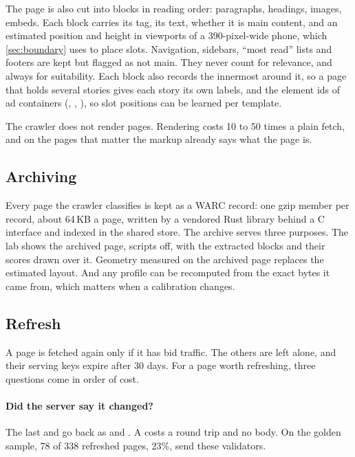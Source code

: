 The page is also cut into blocks in reading order: paragraphs, headings, images, embeds. Each block carries its tag, its text, whether it is main content, and an estimated position and height in viewports of a 390-pixel-wide phone, which \cref{sec:boundary} uses to place slots. Navigation, sidebars, ``most read'' lists and footers are kept but flagged as not main. They never count for relevance, and always for suitability. Each block also records the innermost  around it, so a page that holds several stories gives each story its own labels, and the element ids of ad containers (, , ), so slot positions can be learned per template.

The crawler does not render pages. Rendering costs 10 to 50 times a plain fetch, and on the pages that matter the markup already says what the page is.

\subsection{Archiving}\label{sec:crawl-archive}

Every page the crawler classifies is kept as a WARC record: one gzip member per record, about 64\,KB a page, written by a vendored Rust library behind a C interface and indexed in the shared store. The archive serves three purposes. The lab shows the archived page, scripts off, with the extracted blocks and their scores drawn over it. Geometry measured on the archived page replaces the estimated layout. And any profile can be recomputed from the exact bytes it came from, which matters when a calibration changes.

\subsection{Refresh}\label{sec:crawl-refresh}

A page is fetched again only if it has bid traffic. The others are left alone, and their serving keys expire after 30 days. For a page worth refreshing, three questions come in order of cost.

\paragraph{Did the server say it changed?} The last  and  go back as  and . A  costs a round trip and no body. On the golden sample, 78 of 338 refreshed pages, 23\%, send these validators.

